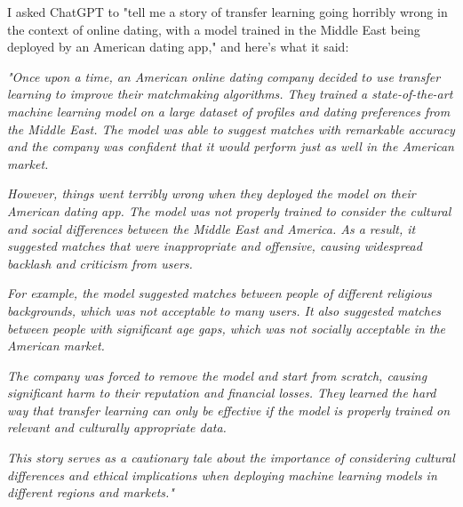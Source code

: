 I asked ChatGPT to "tell me a story of transfer learning going horribly wrong in the context of online dating, with a model trained in the Middle East being deployed by an American dating app," and here's what it said:

\textit{"Once upon a time, an American online dating company decided to use transfer learning to improve their matchmaking algorithms. They trained a state-of-the-art machine learning model on a large dataset of profiles and dating preferences from the Middle East. The model was able to suggest matches with remarkable accuracy and the company was confident that it would perform just as well in the American market.}

\textit{However, things went terribly wrong when they deployed the model on their American dating app. The model was not properly trained to consider the cultural and social differences between the Middle East and America. As a result, it suggested matches that were inappropriate and offensive, causing widespread backlash and criticism from users.}

\textit{For example, the model suggested matches between people of different religious backgrounds, which was not acceptable to many users. It also suggested matches between people with significant age gaps, which was not socially acceptable in the American market.}

\textit{The company was forced to remove the model and start from scratch, causing significant harm to their reputation and financial losses. They learned the hard way that transfer learning can only be effective if the model is properly trained on relevant and culturally appropriate data.}

\textit{This story serves as a cautionary tale about the importance of considering cultural differences and ethical implications when deploying machine learning models in different regions and markets."}

